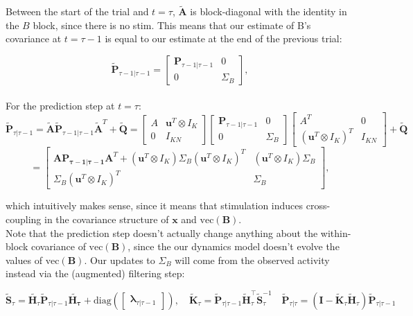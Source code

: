 \documentclass[11pt,letterpaper]{article} %
\begin{document}
\noindent Between the start of the trial and $t=\tau$, $\widetilde{\bm{A}}$ is block-diagonal with the identity in the $B$ block, since there is no stim. This means that our estimate of B's covariance at $t=\tau-1$ is equal to our estimate at the end of the previous trial:

\[
    \widetilde{\bm{P}}_{\tau-1|\tau-1} = \begin{bmatrix}
    \bm{P}_{\tau-1|\tau-1} & 0\\
    0 & \Sigma_B
    \end{bmatrix},
\]
\\
\noindent For the prediction step at $t = \tau$:
\[
    \widetilde{\bm{P}}_{\tau|\tau-1} = 
    \widetilde{\bm{A}}\widetilde{\bm{P}}_{\tau-1|\tau-1}\widetilde{\bm{A}}^T + \widetilde{\bm{Q}} =
    \begin{bmatrix}
    A & \bm{u}^T \otimes I_K \\
    0 & I_{KN}
    \end{bmatrix}
\begin{bmatrix}
    \bm{P}_{\tau-1|\tau-1} & 0\\
    0 & \Sigma_B
    \end{bmatrix}
    \begin{bmatrix}
    A^T & 0\\
    (\bm{u}^T \otimes I_K)^T  & I_{KN}
        \end{bmatrix} + \widetilde{\bm{Q}}
\] 
\[
= \begin{bmatrix}
    \bm{A}\bm{\bm{P}_{\tau-1|\tau-1}}\bm{A}^T + (\bm{u}^T \otimes I_K) \Sigma_B (\bm{u}^T \otimes I_K)^T & (\bm{u}^T \otimes I_K) \Sigma_B \\
    \Sigma_B (\bm{u}^T \otimes I_K)^T & \Sigma_B
\end{bmatrix},
\]

\noindent which intuitively makes sense, since it means that stimulation induces cross-coupling in the covariance structure of $\bm{x}$ and $\textrm{vec}(\bm{B})$. \\

Note that the prediction step doesn't actually change anything about the within-block covariance of $\textrm{vec}(\bm{B})$, since the our dynamics model doesn't evolve the values of $\textrm{vec}(\bm{B})$. Our updates to $\Sigma_B$ will come from the observed activity instead via the (augmented) filtering step:

\[
\widetilde{\bm{S}}_\tau = \widetilde{\bm{H}_\tau}\widetilde{\bm{P}}_{\tau|\tau-1}\widetilde{\bm{H_\tau}} + \text{diag}\left( \begin{bmatrix}
    \bm{\lambda}_{\tau|\tau-1}
\end{bmatrix} \right),
\quad
\widetilde{\bm{K}}_\tau  = \widetilde{\bm{P}}_{\tau|\tau-1}\widetilde{\bm{H}}_\tau^\top \widetilde{\bm{S}}_\tau^{-1}
\quad 
 \widetilde{\bm{P}}_{\tau|\tau} = (\bm{I} - \widetilde{\bm{K}}_\tau \widetilde{\bm{H}}_\tau)\widetilde{\bm{P}}_{\tau|\tau-1}
\]
\end{document}

